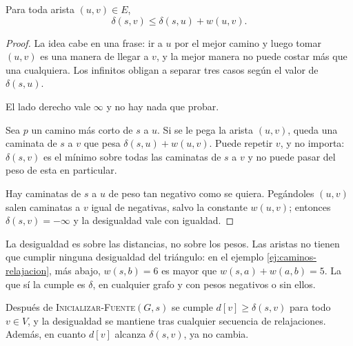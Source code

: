 \documentclass[11pt,letterpaper]{article}
\begin{document}
\begin{lema}
  \label{lem:prueba-triangulo}
  Para toda arista $(u, v) \in E$,
  \[
    \delta(s, v) \le \delta(s, u) + w(u, v) .
  \]
\end{lema}

\begin{proof}
  La idea cabe en una frase: ir a $u$ por el mejor camino y luego
  tomar $(u, v)$ es una manera de llegar a $v$, y la mejor manera no
  puede costar más que una cualquiera. Los infinitos obligan a separar
  tres casos según el valor de $\delta(s, u)$.

   El lado derecho vale $\infty$ y no
  hay nada que probar.

   Sea $p$ un camino más corto de $s$ a
  $u$. Si se le pega la arista $(u, v)$, queda una caminata de $s$ a
  $v$ que pesa $\delta(s, u) + w(u, v)$. Puede repetir $v$, y no
  importa: $\delta(s, v)$ es el mínimo sobre todas las caminatas de
  $s$ a $v$ y no puede pasar del peso de esta en particular.

   Hay caminatas de $s$ a $u$ de peso
  tan negativo como se quiera. Pegándoles $(u, v)$ salen caminatas a
  $v$ igual de negativas, salvo la constante $w(u, v)$; entonces
  $\delta(s, v) = -\infty$ y la desigualdad vale con igualdad.
\end{proof}

\begin{ojo}
  La desigualdad es sobre las distancias, no sobre los pesos. Las
  aristas no tienen que cumplir ninguna desigualdad del triángulo: en
  el ejemplo \ref{ej:caminos-relajacion}, más abajo, $w(s, b) = 6$ es
  mayor que $w(s, a) + w(a, b) = 5$. La que sí la cumple es $\delta$,
  en cualquier grafo y con pesos negativos o sin ellos.
\end{ojo}

\begin{lema}
  \label{lem:prueba-cota-superior}
  Después de \textsc{Inicializar-Fuente}$(G, s)$ se cumple
  $d[v] \ge \delta(s, v)$ para todo $v \in V$, y la desigualdad se
  mantiene tras cualquier secuencia de relajaciones. Además, en cuanto
  $d[v]$ alcanza $\delta(s, v)$, ya no cambia.
\end{lema}
\end{document}
